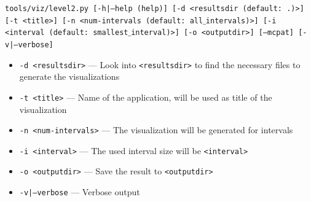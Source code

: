 \documentclass[a4paper,11pt,titlepage]{article}
\newcommand{\cmd}[1]{{\tt #1}}
\newcommand{\opt}[1]{{\tt #1}}
\begin{document}
\cmd{tools/viz/level2.py [-h|--help (help)] [-d <resultsdir (default: .)>] [-t <title>] [-n <num-intervals (default: all$\_$intervals)>] [-i <interval (default: smallest$\_$interval)>] [-o <outputdir>] [--mcpat] [-v|--verbose]}

\begin{itemize}[label=$$]
\item \opt{-d <resultsdir>} --- Look into \opt{<resultsdir>} to find the necessary files to generate the visualizations
\item \opt{-t <title>} --- Name of the application, will be used as title of the visualization
\item \opt{-n <num-intervals>} --- The visualization will be generated for \opt{<num-intervals>} intervals
\item \opt{-i <interval>} --- The used interval size will be \opt{<interval>}
\item \opt{-o <outputdir>} --- Save the result to \opt{<outputdir>}
\item \opt{--mcpat} --- Generate visualizations for McPAT
\item \opt{-v|--verbose} --- Verbose output
\end{itemize}

\subsubsection{\cmd{tools/viz/level3.py}}
Generate the 3D Time-Cores-IPC visualization.

\cmd{tools/viz/level3.py [-h|--help (help)] [-d <resultsdir (default: .)>] [-t <title>] [-n <num-intervals (default: all$\_$intervals)>] [-i <interval (default: smallest$\_$interval)>] [-o <outputdir>] [-v|--verbose]}

\begin{itemize}[label=$$]
\item \opt{-d <resultsdir>} --- Look into \opt{<resultsdir>} to find the necessary files to generate the visualizations
\item \opt{-t <title>} --- Name of the application, will be used as title of the visualization
\item \opt{-n <num-intervals>} --- The visualization will be generated for \opt{<num-intervals>} intervals
\item \opt{-i <interval>} --- The used interval size will be \opt{<interval>}
\item \opt{-o <outputdir>} --- Save the result to \opt{<outputdir>}
\item \opt{-v|--verbose} --- Verbose output
\end{itemize}
\end{document}
